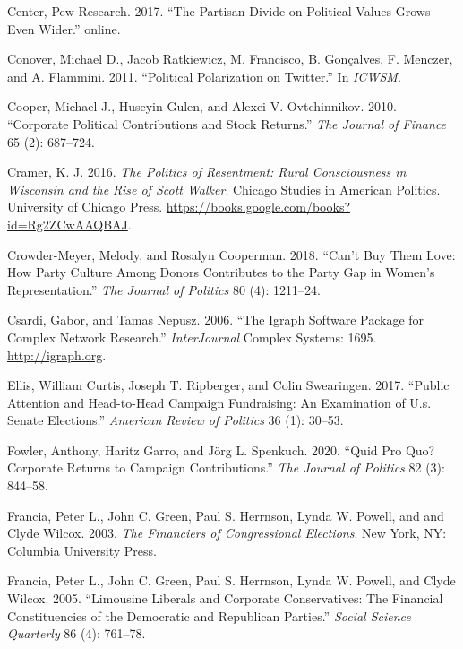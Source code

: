 \documentclass[12pt,]{article}
\begin{document}
\leavevmode\hypertarget{ref-pew2017}{}%
Center, Pew Research. 2017. ``The Partisan Divide on Political Values
Grows Even Wider.'' online.

\leavevmode\hypertarget{ref-conover2011}{}%
Conover, Michael D., Jacob Ratkiewicz, M. Francisco, B. Gonçalves, F.
Menczer, and A. Flammini. 2011. ``Political Polarization on Twitter.''
In \emph{ICWSM}.

\leavevmode\hypertarget{ref-cooper2010}{}%
Cooper, Michael J., Huseyin Gulen, and Alexei V. Ovtchinnikov. 2010.
``Corporate Political Contributions and Stock Returns.'' \emph{The
Journal of Finance} 65 (2): 687--724.

\leavevmode\hypertarget{ref-cramer2016}{}%
Cramer, K. J. 2016. \emph{The Politics of Resentment: Rural
Consciousness in Wisconsin and the Rise of Scott Walker}. Chicago
Studies in American Politics. University of Chicago Press.
\url{https://books.google.com/books?id=Rg2ZCwAAQBAJ}.

\leavevmode\hypertarget{ref-crowder-meyer2018}{}%
Crowder-Meyer, Melody, and Rosalyn Cooperman. 2018. ``Can't Buy Them
Love: How Party Culture Among Donors Contributes to the Party Gap in
Women's Representation.'' \emph{The Journal of Politics} 80 (4):
1211--24.

\leavevmode\hypertarget{ref-igraph}{}%
Csardi, Gabor, and Tamas Nepusz. 2006. ``The Igraph Software Package for
Complex Network Research.'' \emph{InterJournal} Complex Systems: 1695.
\url{http://igraph.org}.

\leavevmode\hypertarget{ref-ellis2017}{}%
Ellis, William Curtis, Joseph T. Ripberger, and Colin Swearingen. 2017.
``Public Attention and Head-to-Head Campaign Fundraising: An Examination
of U.s. Senate Elections.'' \emph{American Review of Politics} 36 (1):
30--53.

\leavevmode\hypertarget{ref-garro2020}{}%
Fowler, Anthony, Haritz Garro, and Jörg L. Spenkuch. 2020. ``Quid Pro
Quo? Corporate Returns to Campaign Contributions.'' \emph{The Journal of
Politics} 82 (3): 844--58.

\leavevmode\hypertarget{ref-francia2003}{}%
Francia, Peter L., John C. Green, Paul S. Herrnson, Lynda W. Powell, and
and Clyde Wilcox. 2003. \emph{The Financiers of Congressional
Elections}. New York, NY: Columbia University Press.

\leavevmode\hypertarget{ref-francia2005}{}%
Francia, Peter L., John C. Green, Paul S. Herrnson, Lynda W. Powell, and
Clyde Wilcox. 2005. ``Limousine Liberals and Corporate Conservatives:
The Financial Constituencies of the Democratic and Republican Parties.''
\emph{Social Science Quarterly} 86 (4): 761--78.
\end{document}
